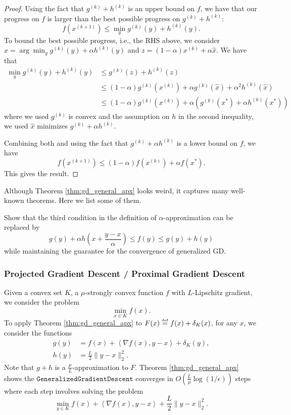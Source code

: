 \begin{proof}
Using the fact that $g^{(k)}+h^{(k)}$ is an upper bound on $f$,
we have that our progress on $f$ is larger than the best possible
progress on $g^{(k)}+h^{(k)}$:
\[
f(x^{(k+1)})\leq\min_{y}g^{(k)}(y)+h^{(k)}(y).
\]
To bound the best possible progress, i.e., the RHS above, we consider
$\widehat{x}=\arg\min_{y}g^{(k)}(y)+\alpha h^{(k)}(y)$ and $z=(1-\alpha)x^{(k)}+\alpha\widehat{x}$.
We have that
\begin{align*}
\min_{y}g^{(k)}(y)+h^{(k)}(y) & \leq g^{(k)}(z)+h^{(k)}(z)\\
 & \leq(1-\alpha)g^{(k)}(x^{(k)})+\alpha g^{(k)}(\widehat{x})+\alpha^{2}h^{(k)}(\widehat{x})\\
 & \leq(1-\alpha)g^{(k)}(x^{(k)})+\alpha(g^{(k)}(x^{*})+\alpha h^{(k)}(x^{*}))
\end{align*}
where we used $g^{(k)}$ is convex and the assumption on $h$ in the
second inequality, we used $\widehat{x}$ minimizes $g^{(k)}+\alpha h^{(k)}$.

Combining both and using the fact that $g^{(k)}+\alpha h^{(k)}$ is
a lower bound on $f$, we have
\[
f(x^{(k+1)})\leq(1-\alpha)f(x^{(k)})+\alpha f(x^{*}).
\]
This gives the result.
\end{proof}
Although Theorem \ref{thm:gd_general_apx} looks weird, it captures
many well-known theorems. Here we list some of them.
\begin{xca}
Show that the third condition in the definition of $\alpha$-approximation
can be replaced by 
\[
g(y)+\alpha h\left(x+\frac{y-x}{\alpha}\right)\leq f(y)\leq g(y)+h(y)
\]
 while maintaining the guarantee for the convergence of generalized
GD.
\end{xca}


\subsubsection*{Projected Gradient Descent / Proximal Gradient Descent}

Given a convex set $K$, a $\mu$-strongly convex function $f$ with
$L$-Lipschitz gradient, we consider the problem
\[
\min_{x\in K}f(x).
\]
To apply Theorem \ref{thm:gd_general_apx} to $F(x)\stackrel{\mathrm{{\scriptscriptstyle def}}}{=} f(x)+\delta_{K}(x)$,
for any $x$, we consider the functions
\begin{align*}
g(y) & =f(x)+\left\langle \nabla f(x),y-x\right\rangle +\delta_{K}(y),\\
h(y) & =\frac{L}{2}\|y-x\|^{2}_{2}.
\end{align*}
Note that $g+h$ is a $\frac{\mu}{L}$-approximation to $F$. Theorem
\ref{thm:gd_general_apx} shows the $\mathtt{GeneralizedGradientDescent}$
converges in $O(\frac{L}{\mu}\log(1/\epsilon))$ steps where each
step involves solving the problem
\[
\min_{y\in K}f(x)+\left\langle \nabla f(x),y-x\right\rangle +\frac{L}{2}\|y-x\|^{2}_{2}.
\]

